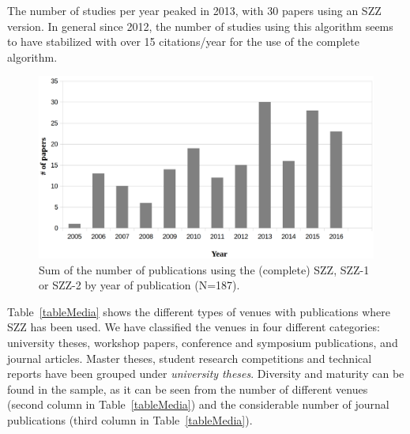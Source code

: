 \documentclass[a4paper, 12pt]{book}
\begin{document}
The number of studies per year peaked in 2013, with 30 papers using an SZZ version. In general since 2012, the number of studies using this algorithm seems to have stabilized with over 15 citations/year for the use of the complete algorithm.

\begin{figure}
\centering
\includegraphics[width=\columnwidth]{img/evolveSZZ.png}
\caption{Sum of the number of publications using the (complete) SZZ, SZZ-1 or SZZ-2 by year of publication (N=187).}
\label{fig:evolveSZZ}       %
\end{figure}

Table~\ref{tableMedia} shows the different types of venues with publications where SZZ has been used. We have classified the venues in four different categories: university theses, workshop papers, conference and symposium publications, and journal articles.
Master theses, student research competitions and technical reports have been grouped under \emph{university theses}.
Diversity and maturity can be found in the sample, as it can be seen from the number of different venues (second column in Table~\ref{tableMedia}) and the considerable number of journal publications (third column in Table~\ref{tableMedia}).
\end{document}
